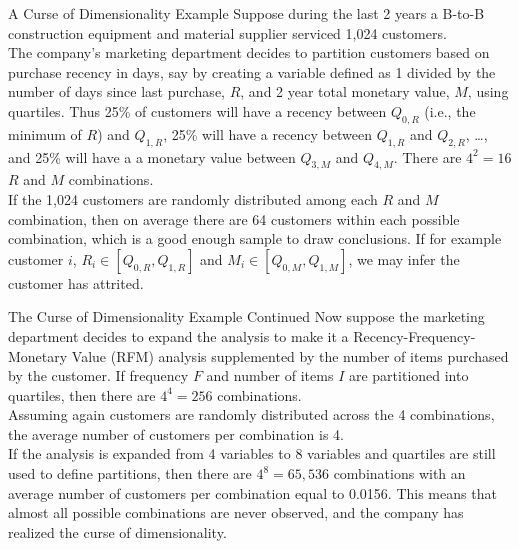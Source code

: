 \documentclass[pdf]{beamer}
\theoremstyle{remark}
\theoremstyle{definition}
\begin{document}
\begin{frame}[t]{A Curse of Dimensionality Example}
Suppose during the last 2 years a B-to-B construction equipment and material supplier serviced 1,024 customers. \\
\vspace{1.5ex}
The company's marketing department decides to partition customers based on purchase recency in days, say by creating a variable defined as 1 divided by the number of days since last purchase, $R$, and 2 year total monetary value, $M$, using quartiles.  Thus 25\% of customers will have a recency between $Q_{0,R}$ (i.e., the minimum of $R$) and $Q_{1,R}$, 25\% will have a recency between $Q_{1,R}$ and $Q_{2,R}$, \ldots, and 25\%  will have a a monetary value between $Q_{3,M}$ and $Q_{4,M}$.  There are $4^2 = 16$ $R$ and $M$ combinations.  \\
\vspace{1.5ex}
If the 1,024 customers are randomly distributed among each $R$ and $M$ combination, then on average there are 64 customers within each possible combination, which is a good enough sample to draw conclusions. If for example customer $i$, $R_i \in [Q_{0,R},Q_{1,R}]$ and $M_i \in [Q_{0,M},Q_{1,M}]$, we may infer the customer has attrited. \\
\end{frame}

\begin{frame}[t]{The Curse of Dimensionality Example Continued}
Now suppose the marketing department decides to expand the analysis to make it a Recency-Frequency-Monetary Value (RFM) analysis supplemented by the number of items purchased by the customer.  If frequency $F$ and number of items $I$ are partitioned into quartiles, then there are $4^4 = 256$ combinations. \\
\vspace{1.5ex} 
Assuming again customers are randomly distributed across the 4 combinations, the average number of customers per combination is 4. \\
\vspace{1.5ex}
If the analysis is expanded from 4 variables to 8 variables and quartiles are still used to define partitions, then there are $4^8 = 65,536$ combinations with an average number of customers per combination equal to 0.0156.  This means that almost all possible combinations are never observed, and the company has realized the curse of dimensionality.
\end{frame}
\end{document}
